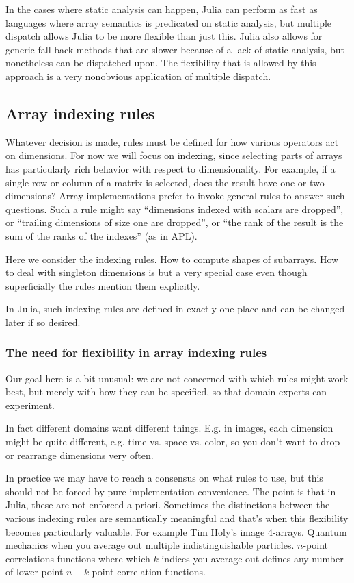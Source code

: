 \documentclass[preprint]{sigplanconf}
\begin{document}
In the cases where static analysis can happen, Julia can perform as fast as
languages where array semantics is predicated on static analysis, but multiple
dispatch allows Julia to be more flexible than just this. Julia also allows
for generic fall-back methods that are slower because of a lack of static
analysis, but nonetheless can be dispatched upon. The flexibility that is
allowed by this approach is a very nonobvious application of multiple
dispatch.

\subsection{Array indexing rules}

Whatever decision is made, rules must be defined for how various operators act
on dimensions. For now we will focus on indexing, since selecting parts of
arrays has particularly rich behavior with respect to dimensionality. For
example, if a single row or column of a matrix is selected, does the result
have one or two dimensions? Array implementations prefer to invoke general
rules to answer such questions. Such a rule might say ``dimensions indexed
with scalars are dropped'', or ``trailing dimensions of size one are
dropped'', or ``the rank of the result is the sum of the ranks of the
indexes'' (as in APL).

Here we consider the indexing rules. How to compute shapes of subarrays. How
to deal with singleton dimensions is but a very special case even though
superficially the rules mention them explicitly.

In Julia, such indexing rules are defined in exactly one place and can be
changed later if so desired.

\subsubsection{The need for flexibility in array indexing rules}

Our goal here is a bit unusual: we are not concerned with which rules might
work best, but merely with how they can be specified, so that domain experts
can experiment.

In fact different domains want different things. E.g. in images, each
dimension might be quite different, e.g. time vs. space vs. color, so you
don't want to drop or rearrange dimensions very often.

In practice we may have to reach a consensus on what rules to use, but this
should not be forced by pure implementation convenience.
The point is that in Julia, these are not enforced a priori. Sometimes the
distinctions between the various indexing rules are semantically meaningful
and that's when this flexibility becomes particularly valuable. For example
Tim Holy's image 4-arrays. Quantum mechanics when you average out multiple
indistinguishable particles. $n$-point correlations functions where which $k$
indices you average out defines any number of lower-point $n-k$ point
correlation functions.
\end{document}
